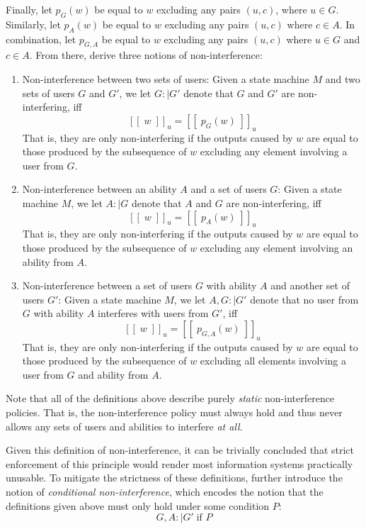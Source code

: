 Finally, let \(p_G(w)\) be equal to \(w\) excluding any pairs \((u,c)\), where \(u \in G\). Similarly, let \(p_A(w)\) be equal to \(w\) excluding any pairs \((u,c)\) where \(c \in A\). In combination, let \(p_{G,A}\) be equal to \(w\) excluding any pairs \((u,c)\) where \(u \in G\) and \(c \in A\).
From there, \citeauthor{Goguen_Meseguer_82} derive three notions of non-interference:
\begin{enumerate}
    \item Non-interference between two sets of users: Given a state machine \(M\) and two sets of users \(G\) and \(G'\), we let \(G :\mid G'\) denote that \(G\) and \(G'\) are non-interfering, iff \[ 
        [[\;w\;]]_u = [[\;p_G(w)\;]]_u  
    \]
    That is, they are only non-interfering if the outputs caused by \(w\) are equal to those produced by the subsequence of \(w\) excluding any element involving a user from \(G\).
    \item Non-interference between an ability \(A\) and a set of users \(G\): Given a state machine \(M\), we let \(A :\mid G\) denote that \(A\) and \(G\) are non-interfering, iff \[
        [[\;w\;]]_u = [[\;p_A(w)\;]]_u  
    \]
    That is, they are only non-interfering if the outputs caused by \(w\) are equal to those produced by the subsequence of \(w\) excluding any element involving an ability from \(A\).
    \item Non-interference between a set of users \(G\) with ability \(A\) and another set of users \(G'\): Given a state machine \(M\), we let \(A,G :\mid G'\) denote that no user from \(G\) with ability \(A\) interferes with users from \(G'\), iff \[
        [[\;w\;]]_u = [[\;p_{G,A}(w)\;]]_u   
    \]
    That is, they are only non-interfering if the outputs caused by \(w\) are equal to those produced by the subsequence of \(w\) excluding all elements involving a user from \(G\) and ability from \(A\).
\end{enumerate}



Note that all of the definitions above describe purely \emph{static} non-interference policies. That is, the non-interference policy must always hold and thus never allows any sets of users and abilities to interfere \emph{at all}. 

Given this definition of non-interference, it can be trivially concluded that strict enforcement of this principle would render most information systems practically unusable.
To mitigate the strictness of these definitions, \citeauthor{Goguen_Meseguer_82} further introduce the notion of \emph{conditional non-interference}, which encodes the notion that the definitions given above must only hold under some condition \(P\): \[
     G,A :\mid G' \; \text{if } P 
\]

